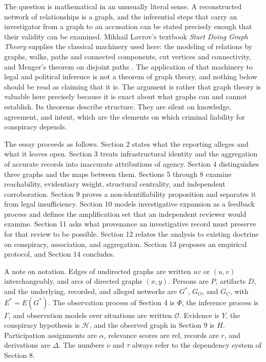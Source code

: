 \documentclass[11pt]{article}
\theoremstyle{definition}
\theoremstyle{remark}
\begin{document}
The question is mathematical in an unusually literal sense. A reconstructed network of relationships is a graph, and the inferential steps that carry an investigator from a graph to an accusation can be stated precisely enough that their validity can be examined. Mikhail Lavrov's textbook \emph{Start Doing Graph Theory} supplies the classical machinery used here: the modeling of relations by graphs, walks, paths and connected components, cut vertices and connectivity, and Menger's theorem on disjoint paths \cite{lavrov2026}. The application of that machinery to legal and political inference is not a theorem of graph theory, and nothing below should be read as claiming that it is. The argument is rather that graph theory is valuable here precisely because it is exact about what graphs can and cannot establish. Its theorems describe structure. They are silent on knowledge, agreement, and intent, which are the elements on which criminal liability for conspiracy depends.

The essay proceeds as follows. Section 2 states what the reporting alleges and what it leaves open. Section 3 treats infrastructural identity and the aggregation of accurate records into inaccurate attributions of agency. Section 4 distinguishes three graphs and the maps between them. Sections 5 through 8 examine reachability, evidentiary weight, structural centrality, and independent corroboration. Section 9 proves a non-identifiability proposition and separates it from legal insufficiency. Section 10 models investigative expansion as a feedback process and defines the amplification set that an independent reviewer would examine. Section 11 asks what provenance an investigative record must preserve for that review to be possible. Section 12 relates the analysis to existing doctrine on conspiracy, association, and aggregation. Section 13 proposes an empirical protocol, and Section 14 concludes.

A note on notation. Edges of undirected graphs are written $uv$ or $(u,v)$ interchangeably, and arcs of directed graphs $(x,y)$. Persons are $P$, artifacts $D$, and the underlying, recorded, and alleged networks are $G^{\ast}$, $G_O$, and $G_C$, with $E^{\ast} = E(G^{\ast})$. The observation process of Section 4 is $\Phi$, the inference process is $\Gamma$, and observation models over situations are written $\mathcal{O}$. Evidence is $Y$, the conspiracy hypothesis is $\mathcal{H}$, and the observed graph in Section 9 is $H$. Participation assignments are $\alpha$, relevance scores are $\mathrm{rel}$, records are $r$, and derivations are $\Delta$. The numbers $\nu$ and $\tau$ always refer to the dependency system of Section 8.
\end{document}
